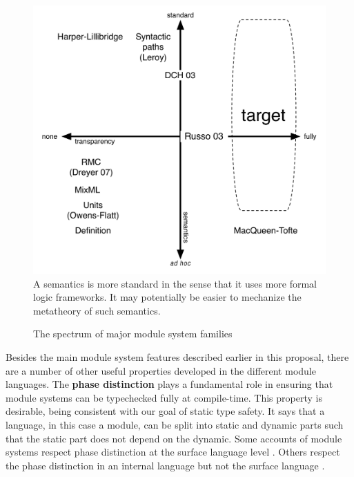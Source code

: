 \documentclass[12pt]{article}
\begin{document}
\begin{figure}
\hrulefill
\includegraphics[scale=0.5]{../../design/figs/modsys-spectrum.pdf}
\hrulefill\\
{\small A semantics is more standard in the sense that it uses more formal logic frameworks. It may potentially be easier to mechanize the metatheory of such semantics.}
\caption{The spectrum of major module system families}
\label{fig:spectrum}
\end{figure}

Besides the main module system features described earlier in this proposal, there are a number of other useful properties developed in the different module languages. The {\bf phase distinction} \cite{hmm:phasedist} plays a fundamental role in ensuring that module systems can be typechecked fully at compile-time. This property is desirable, being consistent with our goal of static type safety. It says that a language, in this case a module, can be split into static and dynamic parts such that the static part does not depend on the dynamic. Some accounts of module systems respect phase distinction at the surface language level \cite{leroy95,russothesis}. Others respect the phase distinction in an internal language but not the surface language \cite{mt94}.  
\end{document}
